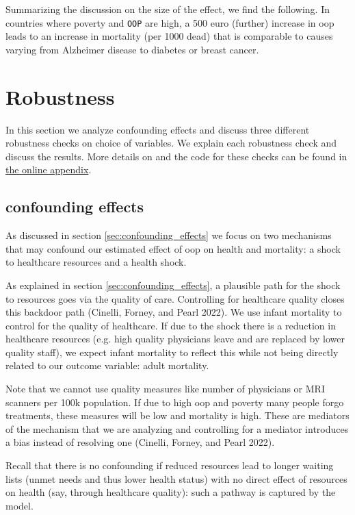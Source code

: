 \documentclass[a4paper,12pt]{article}
\makeatletter
\newcommand{\citeprocitem}[2]{\hyper@linkstart{cite}{citeproc_bib_item_#1}#2\hyper@linkend}
\makeatother
\begin{document}
Summarizing the discussion on the size of the effect, we find the following. In countries where poverty and \texttt{OOP} are high, a 500 euro (further) increase in oop leads to an increase in mortality (per 1000 dead) that is comparable to causes varying from Alzheimer disease to diabetes or breast cancer.



\section{Robustness}
\label{sec:orgbdcfc7e}
In this section we analyze confounding effects and discuss three different robustness checks on choice of variables. We explain each robustness check and discuss the results. More details on and the code for these checks can be found in \href{https://janboone.github.io/out\_of\_pocket\_payments\_and\_health/index.html}{the online appendix}.

\subsection{confounding effects}
\label{sec:org8812f85}

As discussed in section \ref{sec:confounding_effects} we focus on two mechanisms that may confound our estimated effect of oop on health and mortality: a shock to healthcare resources and a health shock.

As explained in section \ref{sec:confounding_effects}, a plausible path for the shock to resources goes via the quality of care. Controlling for healthcare quality closes this backdoor path (\citeprocitem{8}{Cinelli, Forney, and Pearl 2022}). We use infant mortality to control for the quality of healthcare. If due to the shock there is a reduction in healthcare resources (e.g. high quality physicians leave and are replaced by lower quality staff), we expect infant mortality to reflect this while not being directly related to our outcome variable: adult mortality. 

Note that we cannot use quality measures like number of physicians or MRI scanners per 100k population. If due to high oop and poverty many people forgo treatments, these measures will be low and mortality is high. These are mediators of the mechanism that we are analyzing and controlling for a mediator introduces a bias instead of resolving one (\citeprocitem{8}{Cinelli, Forney, and Pearl 2022}).

Recall that there is no confounding if reduced resources lead to longer waiting lists (unmet needs and thus lower health status) with no direct effect of resources on health (say, through healthcare quality): such a pathway is captured by the model.
\end{document}
